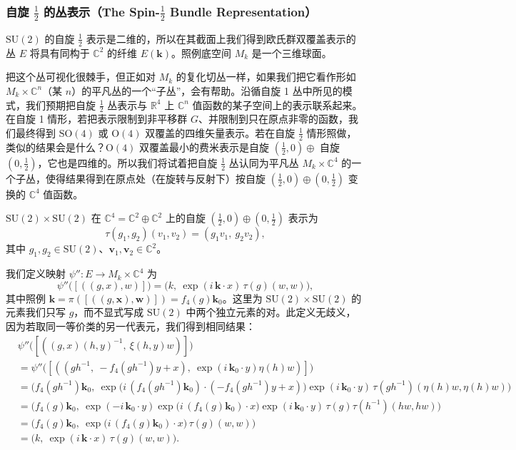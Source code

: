 \subsubsection{自旋 $\tfrac12$ 的丛表示（The Spin-$\tfrac12$ Bundle Representation）}

$\mathrm{SU}(2)$ 的自旋 $\tfrac12$ 表示是二维的，所以在其截面上我们得到欧氏群双覆盖表示的丛 $E$ 将具有同构于 $\mathbb{C}^2$ 的纤维 $E(\mathbf{k})$。照例底空间 $M_k$ 是一个三维球面。

把这个丛可视化很棘手，但正如对 $M_k$ 的复化切丛一样，如果我们把它看作形如 $M_k\times\mathbb{C}^n$（某 $n$）的平凡丛的一个“子丛”，会有帮助。沿循自旋 1 丛中所见的模式，我们预期把自旋 $\tfrac12$ 丛表示与 $\mathbb{R}^4$ 上 $\mathbb{C}^n$ 值函数的某子空间上的表示联系起来。在自旋 1 情形，若把表示限制到非平移群 $G$、并限制到只在原点非零的函数，我们最终得到 $\mathrm{SO}(4)$ 或 $\mathrm{O}(4)$ 双覆盖的四维矢量表示。若在自旋 $\tfrac12$ 情形照做，类似的结果会是什么？$\mathrm{O}(4)$ 双覆盖最小的费米表示是自旋 $(\tfrac12,0)\oplus$ 自旋 $(0,\tfrac12)$，它也是四维的。所以我们将试着把自旋 $\tfrac12$ 丛认同为平凡丛 $M_k\times\mathbb{C}^4$ 的一个子丛，使得结果得到在原点处（在旋转与反射下）按自旋 $(\tfrac12,0)\oplus(0,\tfrac12)$ 变换的 $\mathbb{C}^4$ 值函数。

$\mathrm{SU}(2)\times\mathrm{SU}(2)$ 在 $\mathbb{C}^4=\mathbb{C}^2\oplus\mathbb{C}^2$ 上的自旋 $(\tfrac12,0)\oplus(0,\tfrac12)$ 表示为
\[
\tau(g_1,g_2)(v_1,v_2)=(g_1 v_1,\ g_2 v_2),
\]
其中 $g_1,g_2\in\mathrm{SU}(2)$、$\mathbf{v}_1,\mathbf{v}_2\in\mathbb{C}^2$。

我们定义映射 $\psi'':E\to M_k\times\mathbb{C}^4$ 为
\[
\psi''\big([((g,x),w)]\big)=\big(k,\ \exp(i\,\mathbf{k}\cdot x)\,\tau(g)(w,w)\big),
\]
其中照例 $\mathbf{k}=\pi([((g,\mathbf{x}),\mathbf{w})])=f_4(g)\mathbf{k}_0$。这里为 $\mathrm{SU}(2)\times\mathrm{SU}(2)$ 的元素我们只写 $g$，而不显式写成 $\mathrm{SU}(2)$ 中两个独立元素的对。此定义无歧义，因为若取同一等价类的另一代表元，我们得到相同结果：
\begin{align*}
&\psi''\big([((g,x)(h,y)^{-1},\ \xi(h,y)w)]\big)\\
&=\psi''\big([((gh^{-1},\ -f_4(gh^{-1})y+x),\ \exp(i\,\mathbf{k}_0\cdot y)\eta(h)w)]\big)\\
&=\Big(f_4(gh^{-1})\mathbf{k}_0,\ \exp\big(i\,(f_4(gh^{-1})\mathbf{k}_0)\cdot(-f_4(gh^{-1})y+x)\big)\exp(i\,\mathbf{k}_0\cdot y)\,\tau(gh^{-1})(\eta(h)w,\eta(h)w)\Big)\\
&=\Big(f_4(g)\mathbf{k}_0,\ \exp(-i\,\mathbf{k}_0\cdot y)\exp\big(i\,(f_4(g)\mathbf{k}_0)\cdot x\big)\exp(i\,\mathbf{k}_0\cdot y)\,\tau(g)\tau(h^{-1})(hw,hw)\Big)\\
&=\Big(f_4(g)\mathbf{k}_0,\ \exp\big(i\,(f_4(g)\mathbf{k}_0)\cdot x\big)\,\tau(g)(w,w)\Big)\\
&=\big(k,\ \exp(i\,\mathbf{k}\cdot x)\,\tau(g)(w,w)\big).
\end{align*}

